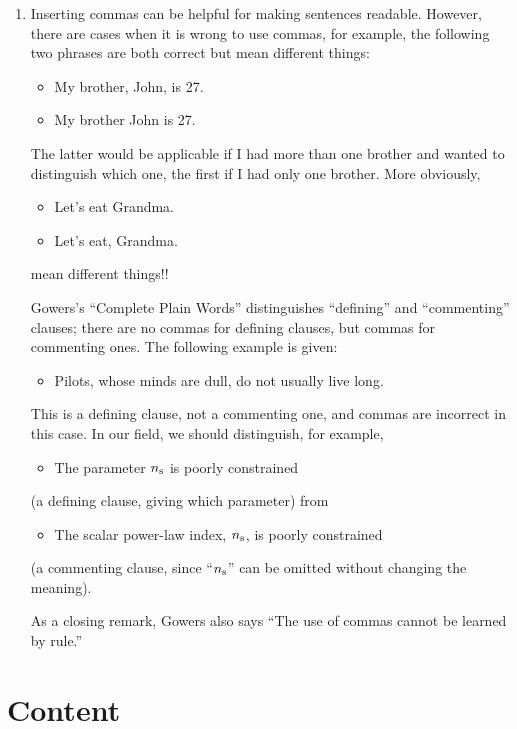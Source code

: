 \documentclass[letterpaper,11pt]{article}
\begin{document}
\begin{enumerate}
\item
Inserting commas can be helpful for making sentences readable.
However, there are cases when it is wrong to use commas, for example, the
following two phrases are both correct but mean different things:
\begin{itemize}
\item My brother, John, is 27.
\item My brother John is 27.
\end{itemize}
The latter would be applicable if I had more than one brother and wanted to
distinguish which one, the first if I had only one brother.  More obviously,
\begin{itemize}
\item Let's eat Grandma.
\item Let's eat, Grandma.
\end{itemize}
mean different things!!

\smallskip
\noindent
Gowers's ``Complete Plain Words'' distinguishes ``defining'' and ``commenting''
clauses; there are no commas for defining clauses, but commas for commenting
ones.  The following example is given:
\begin{itemize}
\item Pilots, whose minds are dull, do not usually live long.
\end{itemize}
This is a defining clause, not a commenting one, and commas are incorrect
in this case.  In our field, we should distinguish, for example,
\begin{itemize}
\item The parameter $n_{\rm s}$ is poorly constrained
\end{itemize}
(a defining clause, giving which parameter) from
\begin{itemize}
\item The scalar power-law index, $n_{\rm s}$, is poorly constrained
\end{itemize}
(a commenting clause, since ``$n_{\rm s}$'' can be omitted without changing
the meaning).

\smallskip
\noindent
As a closing remark, Gowers also says ``The use of commas cannot be learned
by rule.''
\end{enumerate}


\section{Content}
\end{document}
